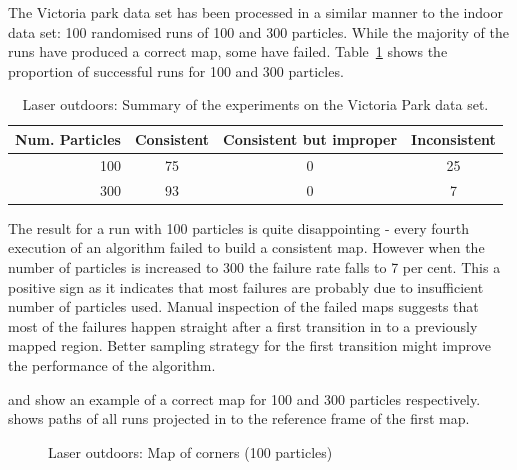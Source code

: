The Victoria park data set has been processed in a similar manner to
the indoor data set: 100 randomised runs of 100 and 300
particles. While the majority of the runs have produced a correct map,
some have failed. Table~\ref{tab:results_victoria_park} shows the
proportion of successful runs for 100 and 300 particles.


\begin{table}[ht]
\center
\begin{tabular}{r|c|c|c}
Num. Particles & Consistent & Consistent but improper & Inconsistent\\
\hline
100 & 75  & 0 & 25 \\
300 & 93  & 0 & 7\\
\end{tabular}
\caption{Laser outdoors: Summary of the experiments on the Victoria Park data set.}
\label{tab:results_victoria_park}
\end{table}

The result for a run with 100 particles is quite disappointing - every
fourth execution of an algorithm failed to build a consistent
map. However when the number of particles is increased to 300 the
failure rate falls to 7 per cent. This a positive sign as it indicates
that most failures are probably due to insufficient number of particles
used. Manual inspection of the failed maps suggests that most of the
failures happen straight after a first transition in to a previously
mapped region. Better sampling strategy for the first transition might
improve the performance of the algorithm.

 and  show
an example of a correct map for 100 and 300 particles
respectively.  shows paths of all runs
projected in to the reference frame of the first map.


\begin{figure}[htbp]
  \centering


  \caption{Laser outdoors: Map of corners (100 particles)} %
  \label{fig:trees_map_100p}
\end{figure}

